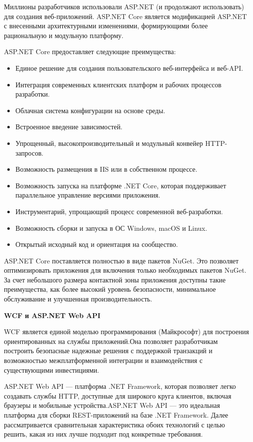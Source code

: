 Миллионы разработчиков использовали ASP.NET (и продолжают использовать) для создания веб-приложений. ASP.NET Core является модификацией ASP.NET с внесенными архитектурными изменениями, формирующими более рациональную и модульную платформу.

ASP.NET Core предоставляет следующие преимущества:

\begin{itemize}
\item Единое решение для создания пользовательского веб-интерфейса и веб-API.
\item Интеграция современных клиентских платформ и рабочих процессов разработки.
\item Облачная система конфигурации на основе среды.
\item Встроенное введение зависимостей.
\item Упрощенный, высокопроизводительный и модульный конвейер HTTP-запросов.
\item Возможность размещения в IIS или в собственном процессе.
\item Возможность запуска на платформе .NET Core, которая поддерживает параллельное управление версиями приложения.
\item Инструментарий, упрощающий процесс современной веб-разработки.
\item Возможность сборки и запуска в ОС Windows, macOS и Linux.
\item Открытый исходный код и ориентация на сообщество.

\end{itemize}

\cite{asp.net_core}

ASP.NET Core поставляется полностью в виде пакетов NuGet. Это позволяет оптимизировать приложения для включения только необходимых пакетов NuGet. За счет небольшого размера контактной зоны приложения доступны такие преимущества, как более высокий уровень безопасности, минимальное обслуживание и улучшенная производительность.

\textbf{WCF и ASP.NET Web API}

WCF является единой моделью программирования (Майкрософт) для построения ориентированных на службы приложений.Она позволяет разработчикам построить безопасные надежные решения с поддержкой транзакций и возможностью межплатформенной интеграции и взаимодействия с существующими инвестициями.

ASP.NET Web API — платформа .NET Framework, которая позволяет легко создавать службы HTTP, доступные для широкого круга клиентов, включая браузеры и мобильные устройства.ASP.NET Web API — это идеальная платформа для сборки REST-приложений на базе .NET Framework. Далее рассматривается сравнительная характеристика обоих технологий с целью решить, какая из них лучше подходит под конкретные требования.

